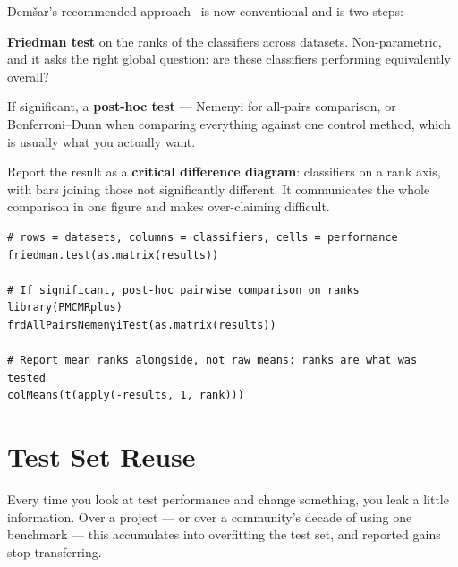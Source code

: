 \begin{conceptbox}
Dem\v{s}ar's recommended approach~\cite{demsar2006statistical} is now
conventional and is two steps:

\begin{tightnum}
  \item \textbf{Friedman test} on the ranks of the classifiers across datasets.
    Non-parametric, and it asks the right global question: are these
    classifiers performing equivalently overall?
  \item If significant, a \textbf{post-hoc test} --- Nemenyi for all-pairs
    comparison, or Bonferroni--Dunn when comparing everything against one
    control method, which is usually what you actually want.
\end{tightnum}

\medskip
Report the result as a \textbf{critical difference diagram}: classifiers on a
rank axis, with bars joining those not significantly different. It communicates
the whole comparison in one figure and makes over-claiming difficult.
\end{conceptbox}

\begin{lstlisting}[language=Rlang, caption={Comparing four classifiers across twelve
datasets, the way it should be done.}]
# rows = datasets, columns = classifiers, cells = performance
friedman.test(as.matrix(results))

# If significant, post-hoc pairwise comparison on ranks
library(PMCMRplus)
frdAllPairsNemenyiTest(as.matrix(results))

# Report mean ranks alongside, not raw means: ranks are what was tested
colMeans(t(apply(-results, 1, rank)))
\end{lstlisting}

\section{Test Set Reuse}

Every time you look at test performance and change something, you leak a little
information. Over a project --- or over a community's decade of using one
benchmark --- this accumulates into overfitting the test set, and reported gains
stop transferring.

